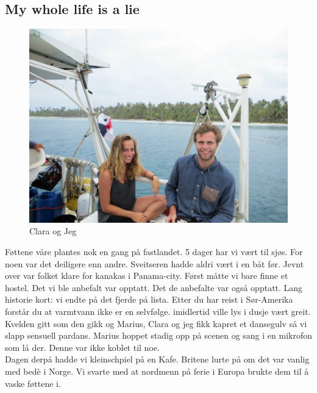 
\begin{figure}[H]
\end{figure}

\\
\subsection*{My whole life is a lie}

\begin{figure}[H]
	\centering
	\includegraphics[width=\textwidth]{akselogclara}
	\caption{Clara og Jeg}
	\label{fig:claraogaksel}
\end{figure}

Føttene våre plantes nok en gang på fastlandet. 5 dager har vi vært
til sjøs.  For
noen var det deiligere enn andre. Sveitseren hadde aldri vært i en båt
før. Jevnt over var folket klare for kanakas i Panama-city.
Først måtte vi bare finne et hostel. Det vi ble anbefalt var opptatt.
Det de anbefalte var også opptatt. Lang historie kort: vi endte på det
fjerde på lista. Etter du har reist i Sør-Amerika forstår du at
varmtvann ikke er en selvfølge. imidlertid ville lys i dusje vært greit.
Kvelden gitt som den gikk og Marius, Clara og jeg fikk kapret et
dansegulv så vi slapp sensuell pardans. Marius hoppet stadig opp på
scenen og sang i en mikrofon som lå der. Denne var ikke koblet til
noe. \\
Dagen derpå hadde vi kleinschpiel på en Kafe. Britene lurte på om
det var vanlig med bedè i Norge. Vi svarte med at nordmenn på ferie i
Europa brukte dem til å vaske føttene i.

